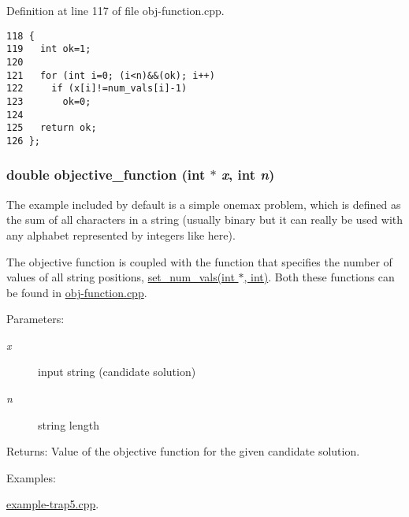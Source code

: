 Definition at line 117 of file obj-function.cpp.

\begin{Code}\begin{verbatim}118 {
119   int ok=1;
120 
121   for (int i=0; (i<n)&&(ok); i++)
122     if (x[i]!=num_vals[i]-1)
123       ok=0;
124 
125   return ok;
126 };
\end{verbatim}\end{Code}


\hypertarget{obj-function_8cpp_633957adde57ee545797def8e74eb8e4}{
\subsubsection[objective\_\-function]{\setlength{\rightskip}{0pt plus 5cm}double objective\_\-function (int $\ast$ {\em x}, int {\em n})}}
\label{obj-function_8cpp_633957adde57ee545797def8e74eb8e4}


The example included by default is a simple onemax problem, which is defined as the sum of all characters in a string (usually binary but it can really be used with any alphabet represented by integers like here). 

The objective function is coupled with the function that specifies the number of values of all string positions, \hyperlink{obj-function_8hpp_1f6693b983930dbfe403246098bbd9ef}{set\_\-num\_\-vals(int $\ast$, int)}. Both these functions can be found in \hyperlink{obj-function_8cpp}{obj-function.cpp}.

\begin{Desc}
\item[Parameters:]
\begin{description}
\item[{\em x}]input string (candidate solution) \item[{\em n}]string length\end{description}
\end{Desc}
\begin{Desc}
\item[Returns:]Value of the objective function for the given candidate solution. \end{Desc}
\begin{Desc}
\item[Examples: ]\par
\hyperlink{example-trap5_8cpp-example}{example-trap5.cpp}.\end{Desc}


